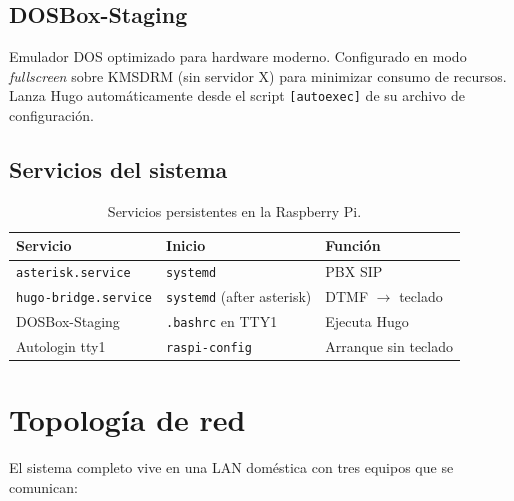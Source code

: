 \subsection{DOSBox-Staging}

Emulador DOS optimizado para hardware moderno. Configurado en modo \emph{fullscreen} sobre KMSDRM (sin servidor X) para minimizar consumo de recursos. Lanza Hugo automáticamente desde el script \texttt{[autoexec]} de su archivo de configuración.

\subsection{Servicios del sistema}

\begin{table}[h]
\centering
\begin{tabular}{lll}
\toprule
\textbf{Servicio} & \textbf{Inicio} & \textbf{Función} \\
\midrule
\texttt{asterisk.service} & \texttt{systemd} & PBX SIP \\
\texttt{hugo-bridge.service} & \texttt{systemd} (after asterisk) & DTMF $\to$ teclado \\
DOSBox-Staging & \texttt{.bashrc} en TTY1 & Ejecuta Hugo \\
Autologin tty1 & \texttt{raspi-config} & Arranque sin teclado \\
\bottomrule
\end{tabular}
\caption{Servicios persistentes en la Raspberry Pi.}
\end{table}

\section{Topología de red}

El sistema completo vive en una LAN doméstica con tres equipos que se comunican:

\begin{center}
\end{center}

